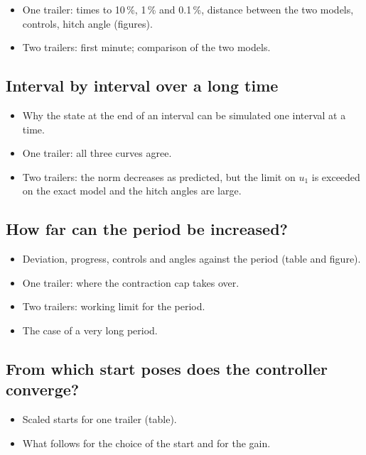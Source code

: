 \begin{itemize}
  \item One trailer: times to 10\,\%, 1\,\% and 0.1\,\%, distance between the two models, controls, hitch angle (figures).
  \item Two trailers: first minute; comparison of the two models.
\end{itemize}

\subsection{Interval by interval over a long time}

\begin{itemize}
  \item Why the state at the end of an interval can be simulated one interval at a time.
  \item One trailer: all three curves agree.
  \item Two trailers: the norm decreases as predicted, but the limit on $u_1$ is exceeded on the exact model and the hitch angles are large.
\end{itemize}

\subsection{How far can the period be increased?}
\label{sec:sim-validity}

\begin{itemize}
  \item Deviation, progress, controls and angles against the period (table and figure).
  \item One trailer: where the contraction cap takes over.
  \item Two trailers: working limit for the period.
  \item The case of a very long period.
\end{itemize}

\subsection{From which start poses does the controller converge?}
\label{sec:sim-envelope}

\begin{itemize}
  \item Scaled starts for one trailer (table).
  \item What follows for the choice of the start and for the gain.
\end{itemize}

